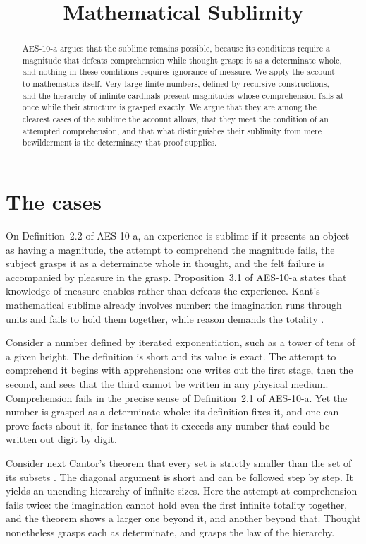 \documentclass{situationist-preprint}
\title{Mathematical Sublimity}
\begin{document}
\maketitle

\begin{abstract}
AES-10-a argues that the sublime remains possible, because its conditions require a magnitude that defeats comprehension while thought grasps it as a determinate whole, and nothing in these conditions requires ignorance of measure. We apply the account to mathematics itself. Very large finite numbers, defined by recursive constructions, and the hierarchy of infinite cardinals present magnitudes whose comprehension fails at once while their structure is grasped exactly. We argue that they are among the clearest cases of the sublime the account allows, that they meet the condition of an attempted comprehension, and that what distinguishes their sublimity from mere bewilderment is the determinacy that proof supplies.
\end{abstract}

\section{The cases}

On Definition~2.2 of AES-10-a, an experience is sublime if it presents an object as having a magnitude, the attempt to comprehend the magnitude fails, the subject grasps it as a determinate whole in thought, and the felt failure is accompanied by pleasure in the grasp. Proposition~3.1 of AES-10-a states that knowledge of measure enables rather than defeats the experience. Kant's mathematical sublime already involves number: the imagination runs through units and fails to hold them together, while reason demands the totality \citep[§§25--27]{Kant1790}.

Consider a number defined by iterated exponentiation, such as a tower of tens of a given height. The definition is short and its value is exact. The attempt to comprehend it begins with apprehension: one writes out the first stage, then the second, and sees that the third cannot be written in any physical medium. Comprehension fails in the precise sense of Definition~2.1 of AES-10-a. Yet the number is grasped as a determinate whole: its definition fixes it, and one can prove facts about it, for instance that it exceeds any number that could be written out digit by digit.

Consider next Cantor's theorem that every set is strictly smaller than the set of its subsets \citep{Cantor1891}. The diagonal argument is short and can be followed step by step. It yields an unending hierarchy of infinite sizes. Here the attempt at comprehension fails twice: the imagination cannot hold even the first infinite totality together, and the theorem shows a larger one beyond it, and another beyond that. Thought nonetheless grasps each as determinate, and grasps the law of the hierarchy.
\end{document}
